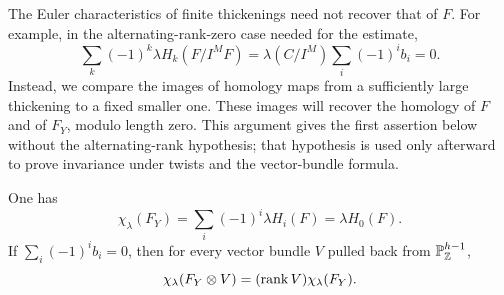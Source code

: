 The Euler characteristics of finite thickenings need not recover that of $F$.
For example, in the alternating-rank-zero case needed for the estimate,
\[
 \sum_k(-1)^k\lambda H_k(F/I^M F)
 =\lambda(C/I^M)\sum_i(-1)^i b_i=0.
\]
Instead, we compare the images of homology maps from a sufficiently
large thickening to a fixed smaller one. These images will recover the
homology of $F$ and of $F_Y$, modulo length zero. This argument gives
the first assertion below without the alternating-rank hypothesis;
that hypothesis is used only afterward to prove invariance under twists
and the vector-bundle formula.

\begin{lemma}\label{lem:complex-euler-comparison}
One has
\begin{equation}\label{eq:complex-euler-comparison}
 \chi_\lambda(F_Y)=\sum_i(-1)^i\lambda H_i(F)=\lambda H_0(F).
\end{equation}
If $\sum_i(-1)^i b_i=0$, then for every vector bundle $V$ pulled back from
$\mathbb P_\mathbb Z^{h-1}$,
\begin{equation}\label{eq:complex-bundle-rank}
 \chi_\lambda(F_Y\otimes V)=(\operatorname{rank} V)\chi_\lambda(F_Y).
\end{equation}
\end{lemma}
